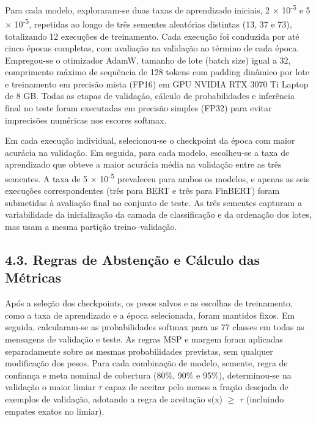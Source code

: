 \documentclass[12pt,a4paper]{article}
\begin{document}
Para cada modelo, exploraram-se duas taxas de aprendizado iniciais, 2 \ensuremath{\times} 10\textsuperscript{-}\textsuperscript{5} e 5 \ensuremath{\times} 10\textsuperscript{-}\textsuperscript{5}, repetidas ao longo de três sementes aleatórias distintas (13, 37 e 73), totalizando 12 execuções de treinamento. Cada execução foi conduzida por até cinco épocas completas, com avaliação na validação ao término de cada época. Empregou-se o otimizador AdamW, tamanho de lote (batch size) igual a 32, comprimento máximo de sequência de 128 tokens com padding dinâmico por lote e treinamento em precisão mista (FP16) em GPU NVIDIA RTX 3070 Ti Laptop de 8 GB. Todas as etapas de validação, cálculo de probabilidades e inferência final no teste foram executadas em precisão simples (FP32) para evitar imprecisões numéricas nos escores softmax.

Em cada execução individual, selecionou-se o checkpoint da época com maior acurácia na validação. Em seguida, para cada modelo, escolheu-se a taxa de aprendizado que obteve a maior acurácia média na validação entre as três sementes. A taxa de 5 \ensuremath{\times} 10\textsuperscript{-}\textsuperscript{5} prevaleceu para ambos os modelos, e apenas as seis execuções correspondentes (três para BERT e três para FinBERT) foram submetidas à avaliação final no conjunto de teste. As três sementes capturam a variabilidade da inicialização da camada de classificação e da ordenação dos lotes, mas usam a mesma partição treino–validação.

\subsection*{\textbf{4.3. Regras de Abstenção e Cálculo das Métricas}}

Após a seleção dos checkpoints, os pesos salvos e as escolhas de treinamento, como a taxa de aprendizado e a época selecionada, foram mantidos fixos. Em seguida, calcularam-se as probabilidades softmax para as 77 classes em todas as mensagens de validação e teste. As regras MSP e margem foram aplicadas separadamente sobre as mesmas probabilidades previstas, sem qualquer modificação dos pesos. Para cada combinação de modelo, semente, regra de confiança e meta nominal de cobertura (80\%, 90\% e 95\%), determinou-se na validação o maior limiar \ensuremath{\tau} capaz de aceitar pelo menos a fração desejada de exemplos de validação, adotando a regra de aceitação s(x) \ensuremath{\geq} \ensuremath{\tau} (incluindo empates exatos no limiar).
\end{document}
